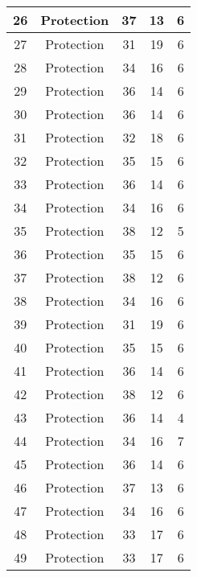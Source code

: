 \documentclass[results.tex]{subfiles}
\begin{document}
\begin{center}
\begin{tabular}{| c || c | c | c | c |}
    \hline
    26 & Protection & 37 & 13 & 6 \\ 
    \hline
    27 & Protection & 31 & 19 & 6 \\ 
    \hline
    28 & Protection & 34 & 16 & 6 \\ 
    \hline
    29 & Protection & 36 & 14 & 6 \\ 
    \hline
    30 & Protection & 36 & 14 & 6 \\ 
    \hline
    31 & Protection & 32 & 18 & 6 \\ 
    \hline
    32 & Protection & 35 & 15 & 6 \\ 
    \hline
    33 & Protection & 36 & 14 & 6 \\ 
    \hline
    34 & Protection & 34 & 16 & 6 \\ 
    \hline
    35 & Protection & 38 & 12 & 5 \\ 
    \hline
    36 & Protection & 35 & 15 & 6 \\ 
    \hline
    37 & Protection & 38 & 12 & 6 \\ 
    \hline
    38 & Protection & 34 & 16 & 6 \\ 
    \hline
    39 & Protection & 31 & 19 & 6 \\ 
    \hline
    40 & Protection & 35 & 15 & 6 \\ 
    \hline
    41 & Protection & 36 & 14 & 6 \\ 
    \hline
    42 & Protection & 38 & 12 & 6 \\ 
    \hline
    43 & Protection & 36 & 14 & 4 \\ 
    \hline
    44 & Protection & 34 & 16 & 7 \\ 
    \hline
    45 & Protection & 36 & 14 & 6 \\ 
    \hline
    46 & Protection & 37 & 13 & 6 \\ 
    \hline
    47 & Protection & 34 & 16 & 6 \\ 
    \hline
    48 & Protection & 33 & 17 & 6 \\ 
    \hline
    49 & Protection & 33 & 17 & 6 \\ 
    \hline   \end{tabular}
\end{center}
\end{document}
